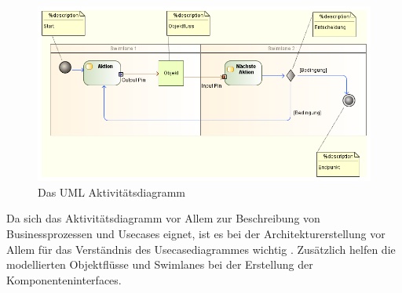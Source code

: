 \begin{figure}[H]
    \centering
    \includegraphics[scale=0.6]{uml/modelling/activity.png}
    \caption{Das UML Aktivitätsdiagramm}
    \label{fig:umlactivitymodel}
\end{figure}


Da sich das Aktivitätsdiagramm vor Allem zur Beschreibung von Businessprozessen und Usecases eignet, ist es bei der Architekturerstellung vor Allem für das Verständnis des Usecasediagrammes wichtig \cite[S. 271-272]{glasklar}. Zusätzlich helfen die modellierten Objektflüsse und Swimlanes bei der Erstellung der Komponenteninterfaces.